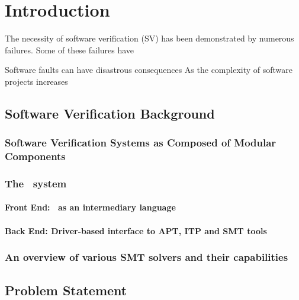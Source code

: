 
\chapter{Introduction} %
\thispagestyle{nohead}
\label{Intro} %


\newcommand{\keyword}[1]{\textbf{#1}}
\newcommand{\tabhead}[1]{\textbf{#1}}
\newcommand{\code}[1]{\texttt{#1}}
\newcommand{\file}[1]{\texttt{\bfseries#1}}
\newcommand{\option}[1]{\texttt{\itshape#1}}
The necessity of software verification (SV) has been demonstrated by numerous failures. 
Some of these failures have

Software faults can have disastrous consequences 
As the complexity of software projects increases

\section{Software Verification Background}
\subsection{Software Verification Systems as Composed of Modular Components}
\subsection{The \why~system}
\subsubsection{Front End: \why~as an intermediary language}
\subsubsection{Back End: Driver-based interface to \textsc{APT}, \textsc{ITP} and \textsc{SMT} tools}
\subsection{An overview of various \textsc{SMT} solvers and their capabilities}
\section{Problem Statement}


